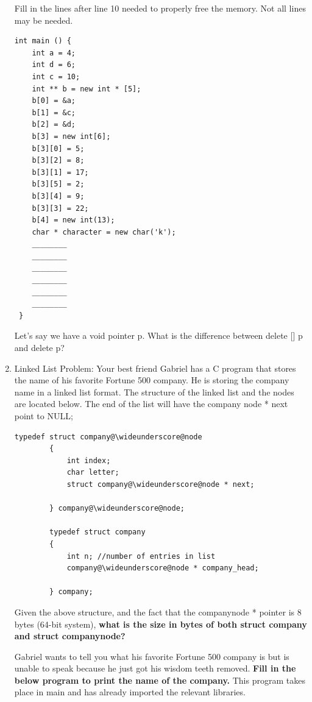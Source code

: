 \documentclass{article}
\newcommand{\wideunderscore}{\underline{\hphantom{n}}}
\begin{document}
\begin{enumerate}[label=(\alph*), itemsep = 120pt]
Fill in the lines after line 10 needed to properly free the memory. Not all lines may be needed.

    \begin{lstlisting}[style=CStyle]
int main () {
    int a = 4;
    int d = 6;
    int c = 10;
    int ** b = new int * [5];  
    b[0] = &a;
    b[1] = &c;   
    b[2] = &d;
    b[3] = new int[6];
    b[3][0] = 5;
    b[3][2] = 8;
    b[3][1] = 17;
    b[3][5] = 2;
    b[3][4] = 9;
    b[3][3] = 22; 
    b[4] = new int(13);
    char * character = new char('k');
    ________
    ________
    ________
    ________
    ________
    ________
 }

    \end{lstlisting}

    Let’s say we have a void pointer p. What is the difference between delete [] p and delete p?



    \item Linked List Problem:
    Your best friend Gabriel has a C program that stores the name of his favorite Fortune 500 company. He is storing the company name in a linked list format. The structure of the linked list and the nodes are located below. The end of the list will have the company \wideunderscore node * next point to NULL;

    \begin{lstlisting}[style = CStyle]
        typedef struct company@\wideunderscore@node
        {
            int index;
            char letter;
            struct company@\wideunderscore@node * next;
            
        } company@\wideunderscore@node;

        typedef struct company
        {
            int n; //number of entries in list
            company@\wideunderscore@node * company_head;
            
        } company;
    \end{lstlisting}

    Given the above structure, and the fact that the company\wideunderscore node * pointer is 8 bytes (64-bit system),
    \textbf{what is the size in bytes of both struct company and struct company\wideunderscore node?}


    \vspace{2.5cm} %
    
    Gabriel wants to tell you what his favorite Fortune 500 company is but is unable to speak because he just got his wisdom teeth removed. \textbf{Fill in the below program to print the name of the company.} This program takes place in main and has already imported the relevant libraries. 


\end{enumerate}
\end{document}
